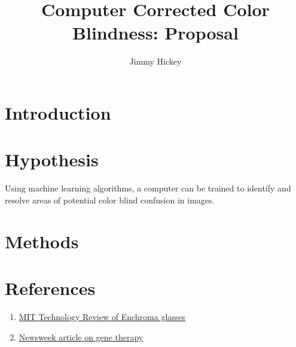 \documentclass[12pt]{article}
\title{
Computer Corrected Color Blindness: Proposal
}
\author{Jimmy Hickey}
\begin{document}
\maketitle
\doublespacing


\section{Introduction}

\section{Hypothesis}
Using machine learning algorithms, a computer can be trained to identify and resolve areas of potential color blind confusion in images.

\section{Methods}

\section{References}
\singlespacing
\begin{enumerate}
	\item
		\href{https://www.technologyreview.com/s/601782/how-enchromas-glasses-correct-color-blindness/}{MIT Technology Review of Enchroma glasses}
	\item
		\href{http://www.newsweek.com/2015/05/22/cure-color-blindness-isnt-just-monkey-business-330258.html}{Newsweek article on gene therapy}
\end{enumerate}
\end{document}
